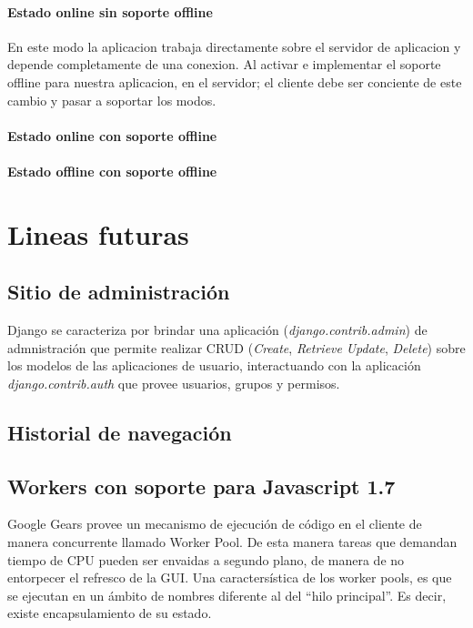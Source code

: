 \documentclass[a4paper]{report}
\begin{document}
\subsubsection{Estado online sin soporte offline}
En este modo la aplicacion trabaja directamente sobre el servidor de aplicacion
y depende completamente de una conexion.
Al activar e implementar el soporte offline para nuestra aplicacion, en el
servidor; el cliente debe ser conciente de este cambio y pasar a soportar los
modos.
\subsubsection{Estado online con soporte offline}
\subsubsection{Estado offline con soporte offline}

\chapter{Lineas futuras}
\section{Sitio de administración}
Django se caracteriza por brindar una aplicación (\textit{django.contrib.admin})
de admnistración que permite realizar CRUD (\textit{Create}, \textit{Retrieve}
\textit{Update}, \textit{Delete}) sobre los modelos de las aplicaciones de
usuario, interactuando con la aplicación \textit{django.contrib.auth} que provee
usuarios, grupos y permisos.
 
\section{Historial de navegación}

\section{Workers con soporte para Javascript 1.7}
Google Gears provee un mecanismo de ejecución de código en el cliente de manera
concurrente llamado Worker Pool. De esta manera tareas que demandan tiempo de
CPU pueden ser envaidas a segundo plano, de manera de no entorpecer el refresco 
de la GUI.
Una caractersística de los worker pools, es que se ejecutan en un ámbito de 
nombres diferente al del ``hilo principal''. Es decir, existe encapsulamiento
de su estado.
 
\end{document}
